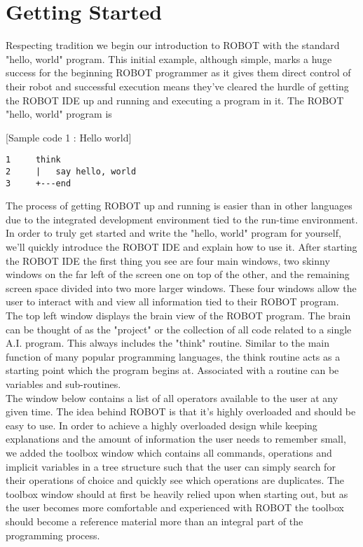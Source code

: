 \documentclass[a4paper]{article}
\begin{document}
\section{Getting Started}

Respecting tradition we begin our introduction to ROBOT with the standard "hello, world" program. This initial example, although simple, marks a huge success for the beginning ROBOT programmer as it gives them direct control of their robot and successful execution means they've cleared the hurdle of getting the ROBOT IDE up and running and executing a program in it. The ROBOT "hello, world" program is

[Sample code 1 : Hello world]
\begin{verbatim}
1     think
2     |   say hello, world
3     +---end
\end{verbatim}

The process of getting ROBOT up and running is easier than in other languages due to the integrated development environment tied to the run-time environment. In order to truly get started and write the "hello, world" program for yourself, we'll quickly introduce the ROBOT IDE and explain how to use it. After starting the ROBOT IDE the first thing you see are four main windows, two skinny windows on the far left of the screen one on top of the other, and the remaining screen space divided into two more larger windows. These four windows allow the user to interact with and view all information tied to their ROBOT program.\\

The top left window displays the brain view of the ROBOT program. The brain can be thought of as the "project" or the collection of all code related to a single A.I. program. This always includes the "think" routine. Similar to the main function of many popular programming languages, the think routine acts as a starting point which the program begins at. Associated with a routine can be variables and sub-routines.\\

The window below contains a list of all operators available to the user at any given time. The idea behind ROBOT is that it's highly overloaded and should be easy to use. In order to achieve a highly overloaded design while keeping explanations and the amount of information the user needs to remember small, we added the toolbox window which contains all commands, operations and implicit variables in a tree structure such that the user can simply search for their operations of choice and quickly see which operations are duplicates. The toolbox window should at first be heavily relied upon when starting out, but as the user becomes more comfortable and experienced with ROBOT the toolbox should become a reference material more than an integral part of the programming process.\\
\end{document}
